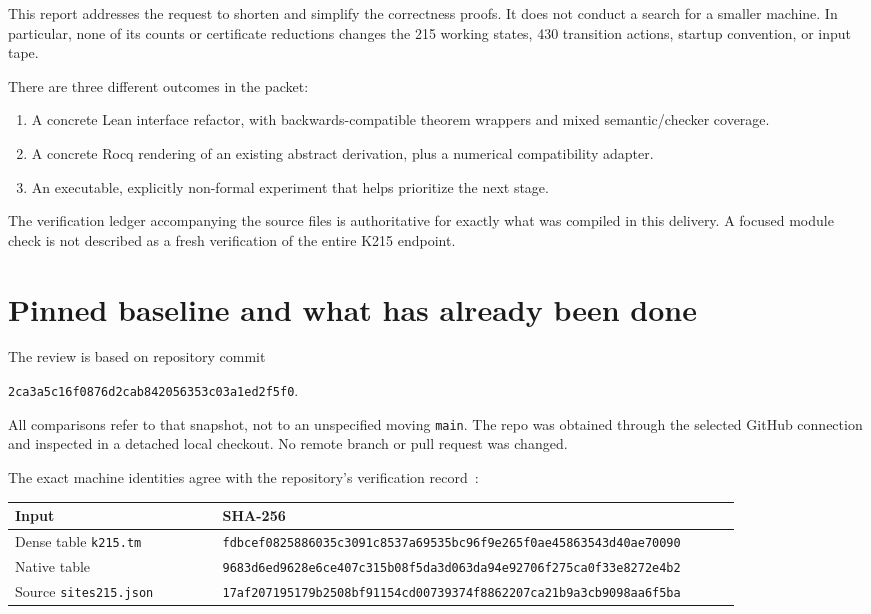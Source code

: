 \documentclass[11pt]{article}
\newcommand{\code}[1]{\texttt{\small #1}}
\newcommand{\snapshot}{\texttt{2ca3a5c16f0876d2cab842056353c03a1ed2f5f0}}
\begin{document}
This report addresses the request to shorten and simplify the correctness proofs. It does not conduct a search for a smaller machine. In particular, none of its counts or certificate reductions changes the 215 working states, 430 transition actions, startup convention, or input tape.

There are three different outcomes in the packet:
\begin{enumerate}
\item A concrete Lean interface refactor, with backwards-compatible theorem wrappers and mixed semantic/checker coverage.
\item A concrete Rocq rendering of an existing abstract derivation, plus a numerical compatibility adapter.
\item An executable, explicitly non-formal experiment that helps prioritize the next stage.
\end{enumerate}
The verification ledger accompanying the source files is authoritative for exactly what was compiled in this delivery. A focused module check is not described as a fresh verification of the entire K215 endpoint.

\section{Pinned baseline and what has already been done}
\label{sec:baseline}

The review is based on repository commit
\begin{center}\snapshot.\end{center}
All comparisons refer to that snapshot, not to an unspecified moving \code{main}. The repo was obtained through the selected GitHub connection and inspected in a detached local checkout. No remote branch or pull request was changed.

The exact machine identities agree with the repository's verification record~\cite{verification}:
\begin{center}\small
\begin{tabular}{p{0.26\linewidth}p{0.65\linewidth}}
\toprule
Input & SHA-256\\\midrule
Dense table \code{k215.tm} & \nolinkurl{fdbcef0825886035c3091c8537a69535bc96f9e265f0ae45863543d40ae70090}\\
Native table & \nolinkurl{9683d6ed9628e6ce407c315b08f5da3d063da94e92706f275ca0f33e8272e4b2}\\
Source \code{sites215.json} & \nolinkurl{17af207195179b2508bf91154cd00739374f8862207ca21b9a3cb9098aa6f5ba}\\
\bottomrule
\end{tabular}
\end{center}
\end{document}
